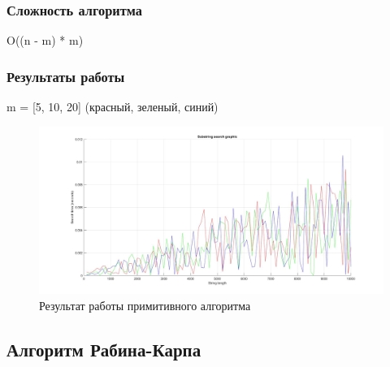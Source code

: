 \documentclass[12pt]{article}
\begin{document}
\subsubsection{Сложность алгоритма}
O((n - m) * m)

\subsubsection{Результаты работы}
m = [5, 10, 20] (красный, зеленый, синий)
\begin{figure}[h]
	\centering
	\includegraphics[width=0.8\linewidth]{Pos.jpg}
	\caption{Результат работы примитивного алгоритма}
\end{figure}
\subsection{Алгоритм Рабина-Карпа}
\end{document}
